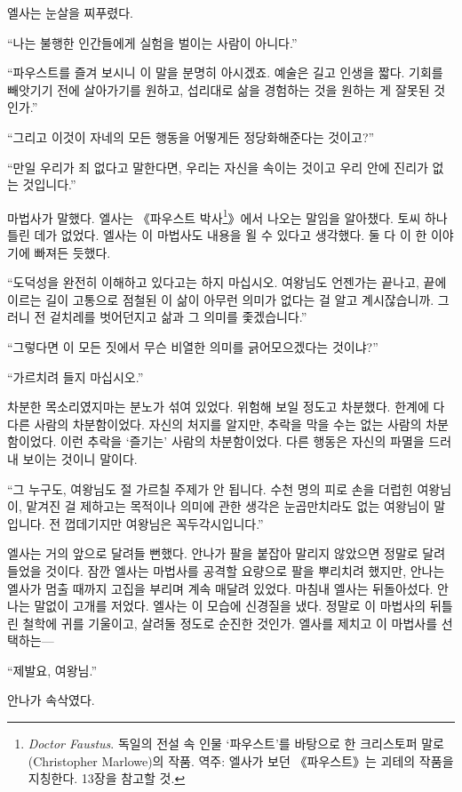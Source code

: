 엘사는 눈살을 찌푸렸다.

``나는 불행한 인간들에게 실험을 벌이는 사람이 아니다.''

``파우스트를 즐겨 보시니 이 말을 분명히 아시겠죠. 예술은 길고 인생을 짧다. 기회를 빼앗기기 전에 살아가기를 원하고, 섭리대로 삶을 경험하는 것을 원하는 게 잘못된 것인가.''

``그리고 이것이 자네의 모든 행동을 어떻게든 정당화해준다는 것이고?''

``만일 우리가 죄 없다고 말한다면, 우리는 자신을 속이는 것이고 우리 안에 진리가 없는 것입니다.''

마법사가 말했다. 엘사는 《파우스트 박사\footnote{\textit{Doctor Faustus}. 독일의 전설 속 인물 `파우스트'를 바탕으로 한 크리스토퍼 말로(Christopher Marlowe)의 작품. 역주: 엘사가 보던 《파우스트》는 괴테의 작품을 지칭한다. 13장을 참고할 것.}》에서 나오는 말임을 알아챘다. 토씨 하나 틀린 데가 없었다. 엘사는 이 마법사도 내용을 욀 수 있다고 생각했다. 둘 다 이 한 이야기에 빠져든 듯했다. 

``도덕성을 완전히 이해하고 있다고는 하지 마십시오. 여왕님도 언젠가는 끝나고, 끝에 이르는 길이 고통으로 점철된 이 삶이 아무런 의미가 없다는 걸 알고 계시잖습니까. 그러니 전 겉치레를 벗어던지고 삶과 그 의미를 좇겠습니다.''

``그렇다면 이 모든 짓에서 무슨 비열한 의미를 긁어모으겠다는 것이냐?''

`` 가르치려 들지 마십시오.''

차분한 목소리였지마는 분노가 섞여 있었다. 위험해 보일 정도고 차분했다. 한계에 다다른 사람의 차분함이었다. 자신의 처지를 알지만, 추락을 막을 수는 없는 사람의 차분함이었다. 이런 추락을 `즐기는' 사람의 차분함이었다. 다른 행동은 자신의 파멸을 드러내 보이는 것이니 말이다.

``그 누구도, 여왕님도 절 가르칠 주제가 안 됩니다. 수천 명의 피로 손을 더럽힌 여왕님이, 맡겨진 걸 제하고는 목적이나 의미에 관한 생각은 눈곱만치라도 없는 여왕님이 말입니다. 전 껍데기지만 여왕님은 꼭두각시입니다.''

엘사는 거의 앞으로 달려들 뻔했다. 안나가 팔을 붙잡아 말리지 않았으면 정말로 달려들었을 것이다. 잠깐 엘사는 마법사를 공격할 요량으로 팔을 뿌리치려 했지만, 안나는 엘사가 멈출 때까지 고집을 부리며 계속 매달려 있었다. 마침내 엘사는 뒤돌아섰다. 안나는 말없이 고개를 저었다. 엘사는 이 모습에 신경질을 냈다. 정말로 이 마법사의 뒤틀린 철학에 귀를 기울이고, 살려둘 정도로 순진한 것인가. 엘사를 제치고 이 마법사를 선택하는—

``제발요, 여왕님.''

안나가 속삭였다.


